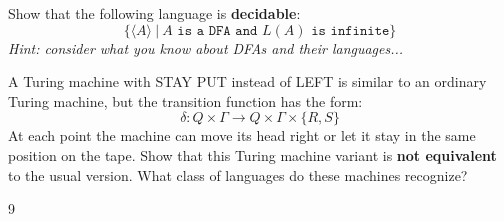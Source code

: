 \documentclass[12pt]{article}
\newenvironment{exercise}[2][Exercise]{\begin{trivlist}
\item[\hskip \labelsep {\bfseries #1}\hskip \labelsep {\bfseries #2.}]}{\end{trivlist}}
\newenvironment{solution}[1][{\color{red} Solution:}]{\begin{trivlist}
\item[\hskip \labelsep {\bfseries #1}\hskip \labelsep {\bfseries}]}{\end{trivlist}}
\begin{document}
\begin{exercise}{4}
Show that the following language is \textbf{decidable}:
\[\{\langle A \rangle \ | \ A \texttt{ is a DFA and } L(A) \texttt{ is infinite}\}\]
\textit{Hint: consider what you know about DFAs and their languages...}
\begin{solution}
\end{solution}

\end{exercise}

\clearpage

\begin{exercise}{5 \textbf{OPTIONAL}}
A Turing machine with STAY PUT instead of LEFT  is similar to an ordinary Turing machine, but the transition function has the form:
\[\delta:Q\times\Gamma \rightarrow Q \times \Gamma \times \{R,S\}\]
At each point the machine can move its head right or let it stay in the same position on the tape. Show that this Turing machine variant is \textbf{not equivalent} to the usual version. What class of languages do these machines recognize?
\end{exercise}

\begin{solution}
\end{solution}

\vfill
\begin{thebibliography}{9}

\end{thebibliography}

\end{document}

